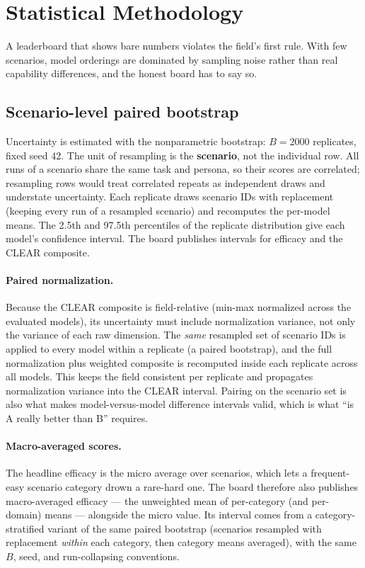 \section{Statistical Methodology}
\label{sec:stats}

A leaderboard that shows bare numbers violates the field's first rule. With few
scenarios, model orderings are dominated by sampling noise rather than real
capability differences, and the honest board has to say so.

\subsection{Scenario-level paired bootstrap}

Uncertainty is estimated with the nonparametric bootstrap: $B = 2000$ replicates,
fixed seed 42. The unit of resampling is the \textbf{scenario}, not the individual
row. All runs of a scenario share the same task and persona, so their scores are
correlated; resampling rows would treat correlated repeats as independent draws and
understate uncertainty. Each replicate draws scenario IDs with replacement (keeping
every run of a resampled scenario) and recomputes the per-model means. The 2.5th and
97.5th percentiles of the replicate distribution give each model's confidence
interval. The board publishes intervals for efficacy and the CLEAR composite.

\paragraph{Paired normalization.} Because the CLEAR composite is field-relative
(min-max normalized across the evaluated models), its uncertainty must include
normalization variance, not only the variance of each raw dimension. The
\emph{same} resampled set of scenario IDs is applied to every model within a
replicate (a paired bootstrap), and the full normalization plus weighted composite
is recomputed inside each replicate across all models. This keeps the field
consistent per replicate and propagates normalization variance into the CLEAR
interval. Pairing on the scenario set is also what makes model-versus-model
difference intervals valid, which is what ``is A really better than B'' requires.

\paragraph{Macro-averaged scores.} The headline efficacy is the micro average
over scenarios, which lets a frequent-easy scenario category drown a rare-hard
one. The board therefore also publishes macro-averaged efficacy — the unweighted
mean of per-category (and per-domain) means — alongside the micro value. Its
interval comes from a category-stratified variant of the same paired bootstrap
(scenarios resampled with replacement \emph{within} each category, then category
means averaged), with the same $B$, seed, and run-collapsing conventions.


